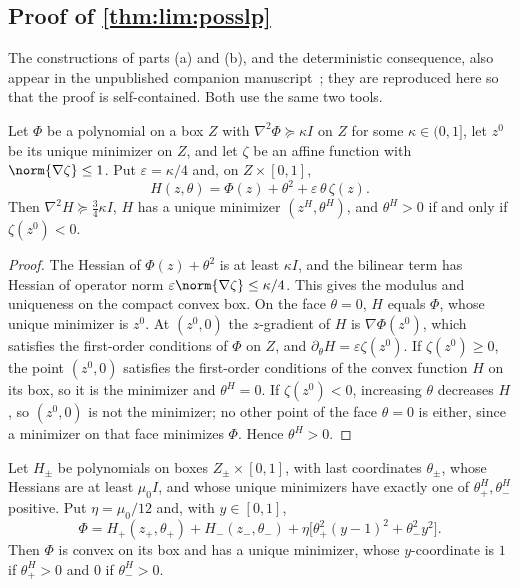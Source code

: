 \subsection{Proof of \texorpdfstring{\cref{thm:lim:posslp}}{the point-output theorem}}\label{app:lim:posslp}

The constructions of parts (a) and (b), and the deterministic consequence,
also appear in the unpublished companion
manuscript~\citep{companion-exact-arithmetic}; they are reproduced here so
that the proof is self-contained. Both use the same two tools.

\begin{lemma}\label{lem:lim:signs}
Let $\Phi$ be a polynomial on a box $Z$ with $\nabla^2\Phi\succeq\kappa I$ on
$Z$ for some $\kappa\in(0,1]$, let $z^0$ be its unique minimizer on $Z$, and
let $\zeta$ be an affine function with $\norm{\nabla\zeta}\le1$. Put
$\varepsilon=\kappa/4$ and, on $Z\times[0,1]$,
\[
 H(z,\theta)=\Phi(z)+\theta^2+\varepsilon\,\theta\,\zeta(z).
\]
Then $\nabla^2H\succeq\frac34\kappa I$, $H$ has a unique minimizer
$(z^H,\theta^H)$, and $\theta^H>0$ if and only if $\zeta(z^0)<0$.
\end{lemma}

\begin{proof}
The Hessian of $\Phi(z)+\theta^2$ is at least $\kappa I$, and the bilinear
term has Hessian of operator norm $\varepsilon\norm{\nabla\zeta}\le\kappa/4$.
This gives the modulus and uniqueness on the compact convex box. On the face
$\theta=0$, $H$ equals $\Phi$, whose unique minimizer is $z^0$. At
$(z^0,0)$ the $z$-gradient of $H$ is $\nabla\Phi(z^0)$, which satisfies the
first-order conditions of $\Phi$ on $Z$, and $\partial_\theta H=\varepsilon
\zeta(z^0)$. If $\zeta(z^0)\ge0$, the point $(z^0,0)$ satisfies the
first-order conditions of the convex function $H$ on its box, so it is the
minimizer and $\theta^H=0$. If $\zeta(z^0)<0$, increasing $\theta$ decreases
$H$, so $(z^0,0)$ is not the minimizer; no other point of the face
$\theta=0$ is either, since a minimizer on that face minimizes $\Phi$. Hence
$\theta^H>0$.
\end{proof}

\begin{lemma}\label{lem:lim:amplifier}
Let $H_\pm$ be polynomials on boxes $Z_\pm\times[0,1]$, with last coordinates
$\theta_\pm$, whose Hessians are at least $\mu_0I$, and whose unique
minimizers have exactly one of $\theta_+^H,\theta_-^H$ positive. Put
$\eta=\mu_0/12$ and, with $y\in[0,1]$,
\[
 \Phi=H_+(z_+,\theta_+)+H_-(z_-,\theta_-)
 +\eta\bigl[\theta_+^2(y-1)^2+\theta_-^2y^2\bigr].
\]
Then $\Phi$ is convex on its box and has a unique minimizer, whose
$y$-coordinate is $1$ if $\theta_+^H>0$ and $0$ if $\theta_-^H>0$.
\end{lemma}

